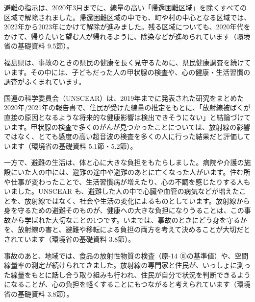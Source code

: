 避難の指示は、2020年3月までに、線量の高い「帰還困難区域」を除くすべての区域で解除されました。帰還困難区域の中でも、町や村の中心となる区域では、2022年から2023年にかけて解除が進みました。残る区域についても、2020年代をかけて、帰りたいと望む人が帰れるように、除染などが進められています（環境省の基礎資料 9.5節）。

福島県は、事故のときの県民の健康を長く見守るために、県民健康調査を続けています。その中には、子どもだった人の甲状腺の検査や、心の健康・生活習慣の調査がふくまれています。

国連の科学委員会（UNSCEAR）は、2019年までに発表された研究をまとめた2020年/2021年の報告書で、住民が受けた線量の推定をもとに、「放射線被ばくが直接の原因となるような将来的な健康影響は検出できそうにない」と結論づけています。甲状腺の検査で多くのがんが見つかったことについては、放射線の影響ではなく、とても感度の高い超音波の検査を多くの人に行った結果だと評価しています（環境省の基礎資料 5.1節・5.2節）。

一方で、避難の生活は、体と心に大きな負担をもたらしました。病院や介護の施設にいた人の中には、避難の途中や避難のあとに亡くなった人がいます。住む所や仕事が変わったことで、生活習慣病が増えたり、心の不調を感じたりする人もいました。UNSCEAR も、避難した人の中で心臓や血管の病気などが増えたことを、放射線ではなく、社会や生活の変化によるものとしています。放射線から身を守るための避難そのものが、健康への大きな負担になりうることは、この事故から学ばれた大切なことの1つです。いまでは、事故のときにどう身を守るかを、放射線の害と、避難や移転による負担の両方を考えて決めることが大切だとされています（環境省の基礎資料 3.8節）。

事故のあと、地域では、食品の放射性物質の検査（原-14 ⑧の基準値）や、空間線量率の測定が続けられてきました。放射線の専門家と住民が、いっしょに測った線量をもとに話し合う取り組みも行われ、住民が自分で状況を判断できるようになることが、心の負担を軽くすることにもつながると考えられています（環境省の基礎資料 3.8節）。

